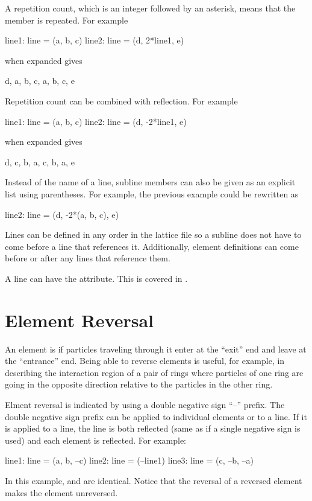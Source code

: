 A repetition count, which is an integer followed by an asterisk, 
means that the member is
repeated. For example
\begin{example}
  line1: line = (a, b, c)
  line2: line = (d, 2*line1, e)
\end{example}
 when expanded gives
\begin{example}
  d, a, b, c, a, b, c, e
\end{example}
Repetition count can be combined with reflection. For example
\begin{example}
  line1: line = (a, b, c)
  line2: line = (d, -2*line1, e)
\end{example}
 when expanded gives
\begin{example}
  d, c, b, a, c, b, a, e
\end{example}
Instead of the name of a line, subline members can also be given as an explicit 
list using parentheses. For example, the previous example could be rewritten as
\begin{example}
  line2: line = (d, -2*(a, b, c), e)
\end{example}

Lines can be defined in any order in the lattice file so a subline
does not have to come before a line that references it. Additionally,
element definitions can come before or after any lines that reference
them.

A line can have the  attribute. This is covered in
.

\section{Element Reversal}
\label{s:ele.reverse}

An element is  if particles traveling through it enter at
the ``exit'' end and leave at the ``entrance'' end. Being able to
reverse elements is useful, for example, in describing the interaction
region of a pair of rings where particles of one ring are going in the
opposite direction relative to the particles in the other ring.

Elment reversal is indicated by using a double negative sign ``--''
prefix. The double negative sign prefix can be applied to individual
elements or to a line. If it is applied to a line, the line is both
reflected (same as if a single negative sign is used) and each element
is reflected. For example:
\begin{example}
  line1: line = (a, b, --c)
  line2: line = (--line1)
  line3: line = (c, --b, --a)
\end{example}
In this example,  and  are identical. Notice that
the reversal of a reversed element makes the element unreversed.


